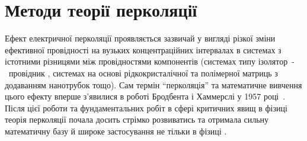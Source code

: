 \documentclass[14pt,twoside]{vakthesis}
\begin{document}


\section{Методи теорії перколяції}\label{sec:perc}
 
Ефект електричної перколяції проявляється зазвичай у вигляді різкої зміни ефективної провідності на вузьких концентраційних інтервалах в системах з істотними різницями між провідностями компонентів (системах типу ізолятор~-~провідник \cite{Grannan1981,ChenI.-G.1986}, системах на основі рідкокристалічної \cite{Tomylko2015, Lebovka2017} та полімерної \cite{Lebovka2011, Lysenkov2012, Klepko2015} матриць з додаванням нанотрубок тощо). 
Сам термін ``перколяція'' та математичне вивчення цього ефекту вперше з'явилися в роботі Бродбента і Хаммерслі у 1957 році~\cite{Broad57}. Після цієї роботи та фундаментальних робіт в сфері критичних явищ в фізиці теорія перколяції почала досить стрімко розвиватись та отримала сильну математичну базу \cite{BergmanB, Kirkpatrick1973, Aharony, Bollobas, Meester, Sahimi, Hunt} й широке застосування не тільки в фізиці \cite{Aharony,Sahimi2}. 
\end{document}
